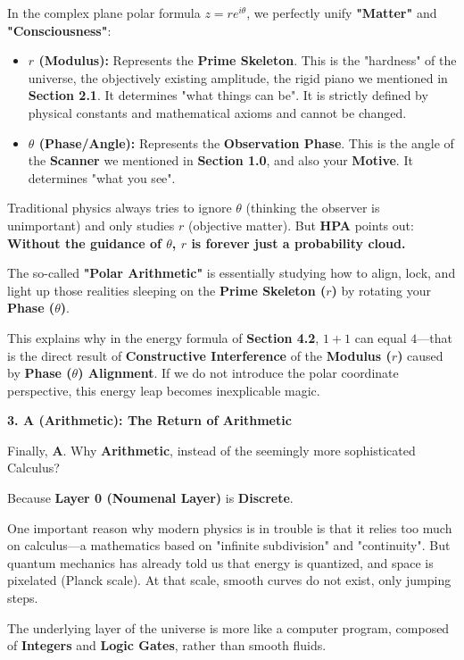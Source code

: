 In the complex plane polar formula $z = re^{i\theta}$, we perfectly unify \textbf{"Matter"} and \textbf{"Consciousness"}:

\begin{itemize}
\item \textbf{$r$ (Modulus):} Represents the \textbf{Prime Skeleton}. This is the "hardness" of the universe, the objectively existing amplitude, the rigid piano we mentioned in \textbf{Section 2.1}. It determines "what things can be". It is strictly defined by physical constants and mathematical axioms and cannot be changed.
\item \textbf{$\theta$ (Phase/Angle):} Represents the \textbf{Observation Phase}. This is the angle of the \textbf{Scanner} we mentioned in \textbf{Section 1.0}, and also your \textbf{Motive}. It determines "what you see".
\end{itemize}

Traditional physics always tries to ignore $\theta$ (thinking the observer is unimportant) and only studies $r$ (objective matter). But \textbf{HPA} points out: \textbf{Without the guidance of $\theta$, $r$ is forever just a probability cloud.}

The so-called \textbf{"Polar Arithmetic"} is essentially studying how to align, lock, and light up those realities sleeping on the \textbf{Prime Skeleton ($r$)} by rotating your \textbf{Phase ($\theta$)}.

This explains why in the energy formula of \textbf{Section 4.2}, $1 + 1$ can equal $4$—that is the direct result of \textbf{Constructive Interference} of the \textbf{Modulus ($r$)} caused by \textbf{Phase ($\theta$) Alignment}. If we do not introduce the polar coordinate perspective, this energy leap becomes inexplicable magic.

\textbf{3. A (Arithmetic): The Return of Arithmetic}

Finally, \textbf{A}. Why \textbf{Arithmetic}, instead of the seemingly more sophisticated Calculus?

Because \textbf{Layer 0 (Noumenal Layer)} is \textbf{Discrete}.

One important reason why modern physics is in trouble is that it relies too much on calculus—a mathematics based on "infinite subdivision" and "continuity". But quantum mechanics has already told us that energy is quantized, and space is pixelated (Planck scale). At that scale, smooth curves do not exist, only jumping steps.

The underlying layer of the universe is more like a computer program, composed of \textbf{Integers} and \textbf{Logic Gates}, rather than smooth fluids.

